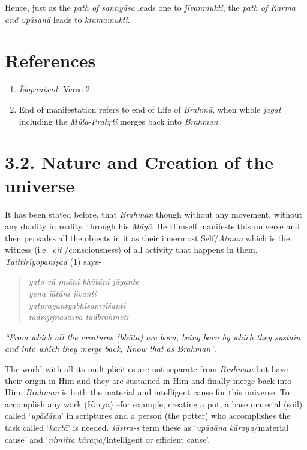 Hence, just as the \emph{path of sannyāsa} leads one to \emph{jīvanmukti}, the \emph{path of Karma and upāsanā} leads to \emph{kramamukti}.

\section*{References}

\begin{enumerate}
\itemsep=0pt
\item
  \emph{Īśopaniṣad}- Verse 2
\item
  End of manifestation refers to end of Life of \emph{Brahmā}, when whole \emph{jagat} including the \emph{Mūla}-\emph{Prakṛti} merges back into \emph{Brahman}.
\end{enumerate}
\newpage

\section*{3.2. Nature and Creation of the universe}

It has been stated before, that \emph{Brahman} though without any movement, without any duality in reality, through his \emph{Māyā}, He Himself manifests this universe and then pervades all the objects in it as their innermost Self/\emph{Ātman} which is the witness (i.e.\ \emph{cit} /consciousness) of all activity that happens in them. \emph{Taittirīyopaniṣad} (1) says-

\begin{verse}
\emph{yato vā imāni bhūtāni jāyante}\\
\emph{yena jātāni jīvanti}\\
\emph{yatprayantyabhisamviśanti}\\
\emph{tadvijijñāsasva tadbrahmeti }
\end{verse}

\emph{``From which all the creatures (bhūta) are born, being born by which they sustain and into which they merge back, Know that as Brahman''.}

The world with all its multiplicities are not separate from \emph{Brahman} but have their origin in Him and they are sustained in Him and finally merge back into Him. \emph{Brahman} is both the material and intelligent cause for this universe. To accomplish any work (Karya) --for example, creating a pot, a base material (soil) called `\emph{upādāna}' in scriptures and a person (the potter) who accomplishes the task called `\emph{kartā}' is needed. \emph{śāstra-s} term these as `\emph{upādāna} \emph{kāraṇa}/material cause' and `\emph{nimitta} \emph{kāraṇa}/intelligent or efficient cause'.

